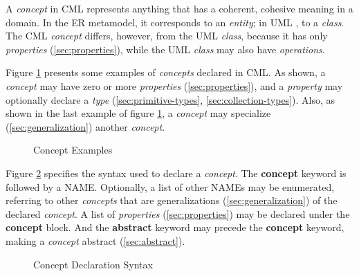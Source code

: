 \begin{definition}
A \emph{concept} in CML represents anything
that has a coherent, cohesive meaning in a domain.
In the ER \cite{er} metamodel,
it corresponds to an \emph{entity};
in UML \cite{uml},
to a \emph{class}.
The CML \emph{concept} differs, however, from the UML \emph{class},
because it has only \emph{properties} (\ref{sec:properties}),
while the UML \emph{class} may also have \emph{operations}.
\end{definition}

\begin{examples}
Figure \ref{fig:ex:concepts} presents some examples of \emph{concepts} declared in CML.
As shown,
a \emph{concept} may have zero or more \emph{properties}
(\ref{sec:properties}),
and a \emph{property} may optionally declare a \emph{type}
(\ref{sec:primitive-types}, \ref{sec:collection-types}).
Also, as shown in the last example of figure \ref{fig:ex:concepts},
a \emph{concept} may specialize
(\ref{sec:generalization})
another \emph{concept}.
\end{examples}

\begin{figure}
\verbatimfont{\small}

\caption{Concept Examples}
\label{fig:ex:concepts}
\end{figure}

\begin{concrete-syntax}
Figure \ref{fig:stx:concept} specifies the syntax used
to declare a \emph{concept}.
The \textbf{concept} keyword is followed by a NAME.
Optionally, a list of other NAMEs may be enumerated,
referring to other \emph{concepts}
that are generalizations (\ref{sec:generalization}) of the declared \emph{concept}.
A list of \emph{properties} (\ref{sec:properties}) may be declared under the \textbf{concept} block.
And the \textbf{abstract} keyword may precede the \textbf{concept} keyword, making a \emph{concept} abstract (\ref{sec:abstract}).
\end{concrete-syntax}

\begin{figure}
\verbatimfont{\small}

\caption{Concept Declaration Syntax}
\label{fig:stx:concept}
\end{figure}

